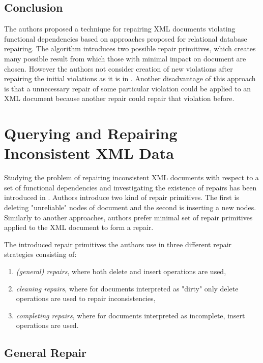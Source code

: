 \subsection{Conclusion}

The authors proposed a technique for repairing XML documents violating functional dependencies based on approaches proposed for relational database repairing. The algorithm introduces two possible repair primitives, which creates many possible result from which those with minimal impact on document are chosen. However the authors not consider creation of new violations after repairing the initial violations as it is in \cite{ImprovingXML}. Another disadvantage of this approach is that a unnecessary repair of some particular violation could be applied to an XML document because another repair could repair that violation before.

\section{Querying and Repairing Inconsistent XML Data}

Studying the problem of repairing inconsistent XML documents with respect to a set of functional dependencies and investigating the existence of repairs has been introduced in \cite{QueryXML}. Authors introduce two kind of repair primitives. The first is deleting "unreliable" nodes of document and the second is inserting a new nodes. Similarly to another approaches, authors prefer minimal set of repair primitives applied to the XML document to form a repair.

The introduced repair primitives the authors use in three different repair strategies consisting of:
\begin{enumerate}
	\item \textit{(general) repairs}, where both delete and insert operations are used,
	\item \textit{cleaning repairs}, where for documents interpreted as "dirty" only delete operations are used to repair inconsistencies,
	\item \textit{completing repairs}, where for documents interpreted as incomplete, insert operations are used.
\end{enumerate}

\subsection{General Repair}

